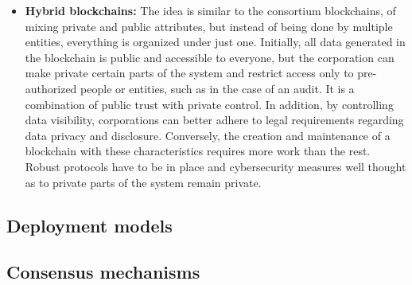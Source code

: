 \begin{itemize}
    \item \textbf{Hybrid blockchains:} The idea is similar to the consortium blockchains, of mixing private and public attributes, but instead of being done by multiple entities, everything is organized under just one. Initially, all data generated in the blockchain is public and accessible to everyone, but the corporation can make private certain parts of the system and restrict access only to pre-authorized people or entities, such as in the case of an audit. It is a combination of public trust with private control. In addition, by controlling data visibility, corporations can better adhere to legal requirements regarding data privacy and disclosure. Conversely, the creation and maintenance of a blockchain with these characteristics requires more work than the rest. Robust protocols have to be in place and cybersecurity measures well thought as to private parts of the system remain private.
\end{itemize}
    
\subsection{Deployment models}

\subsection{Consensus mechanisms}

